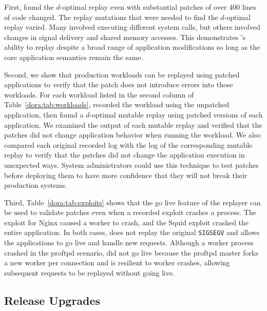 First, {\dora} found the $d$-optimal replay
even with substantial patches of
over 400 lines of code changed. The replay mutations
that were needed to find the $d$-optimal replay varied. Many involved
executing different system calls, but others involved changes in
signal delivery and shared memory accesses. This demonstrates
{\dora}'s ability to replay despite a broad range of application
modifications so long as the core application semantics remain the
same.

Second, we show that production workloads can be replayed using patched
applications to verify that the patch does not introduce errors
into those workloads.
For each workload listed in the second column of Table~\ref{dora:tab:workloads},
{\dora} recorded the workload using the unpatched application, then found a
$d$-optimal mutable replay using patched versions of each application.  We
examined the output of each mutable replay and verified that the patches did not
change application behavior when running the workload.  We also compared each
original recorded log with the log of the corresponding mutable replay to verify
that the patches did not change the application execution in unexpected ways.
System administrators could use this technique to test patches before deploying
them to have more confidence that they will not break their production systems.

Third, Table~\ref{dora:tab:exploits} shows that the go live feature of the replayer
can be used to validate patches even when a recorded exploit crashes a process.
The exploit for Nginx caused a worker to crash, and the Squid exploit crashed the
entire application.
In both cases, {\dora} does not replay
the original {\tt SIGSEGV} and allows the applications to go live
and handle new requests. Although a worker process crashed in the proftpd
scenario, {\dora} did not go live because the
proftpd master forks a new worker per connection and is resilient to worker
crashes, allowing subsequent requests to be replayed without going live.

\subsection{Release Upgrades}
\label{dora:sec:upgrades}

